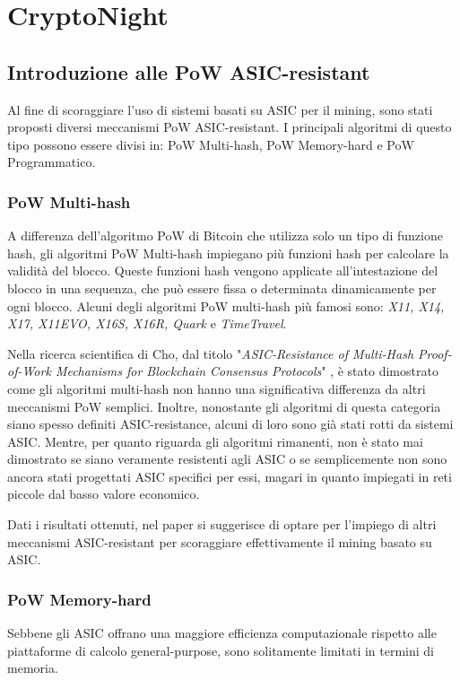 
\chapter{CryptoNight}
\section{Introduzione alle PoW ASIC-resistant}
Al fine di scoraggiare l'uso di sistemi basati su ASIC per il mining, sono stati proposti diversi meccanismi PoW ASIC-resistant.
I principali algoritmi di questo tipo possono essere divisi in: PoW Multi-hash, PoW Memory-hard e PoW Programmatico.

\subsection{PoW Multi-hash}
A differenza dell'algoritmo PoW di Bitcoin che utilizza solo un tipo di funzione hash, gli algoritmi PoW Multi-hash impiegano più funzioni hash per calcolare la validità del blocco. Queste funzioni hash vengono applicate all'intestazione del blocco in una sequenza, che può essere fissa o determinata dinamicamente per ogni blocco. 
Alcuni degli algoritmi PoW multi-hash più famosi sono: \textit{X11, X14, X17, X11EVO, X16S, X16R, Quark} e \textit{TimeTravel}.

Nella ricerca scientifica di Cho, dal titolo "\textit{ASIC-Resistance of Multi-Hash Proof-of-Work Mechanisms for Blockchain Consensus Protocols}" \cite{asic1}, è stato dimostrato come gli algoritmi multi-hash non hanno una significativa differenza da altri meccanismi PoW semplici.
Inoltre, nonostante gli algoritmi di questa categoria siano spesso definiti ASIC-resistance, alcuni di loro sono già stati rotti da sistemi ASIC.
Mentre, per quanto riguarda gli algoritmi rimanenti, non è stato mai dimostrato se siano veramente resistenti agli ASIC o se semplicemente non sono ancora stati progettati ASIC specifici per essi, magari in quanto impiegati in reti piccole dal basso valore economico.

Dati i risultati ottenuti, nel paper si suggerisce di optare per l'impiego di altri meccanismi ASIC-resistant per scoraggiare effettivamente il mining basato su ASIC.


\subsection{PoW Memory-hard}
Sebbene gli ASIC offrano una maggiore efficienza computazionale rispetto alle piattaforme di calcolo general-purpose, sono solitamente limitati in termini di memoria.
    
